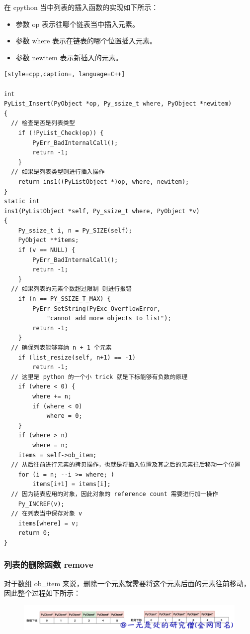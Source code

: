 在 cpython 当中列表的插入函数的实现如下所示：
\begin{itemize}
\item 参数 op 表示往哪个链表当中插入元素。 
\item 参数 where 表示在链表的哪个位置插入元素。 
\item 参数 newitem 表示新插入的元素。 
\end{itemize}
\begin{lstlisting}[style=cpp,caption=, language=C++]

int
PyList_Insert(PyObject *op, Py_ssize_t where, PyObject *newitem)
{
  // 检查是否是列表类型
    if (!PyList_Check(op)) {
        PyErr_BadInternalCall();
        return -1;
    }
  // 如果是列表类型则进行插入操作
    return ins1((PyListObject *)op, where, newitem);
}
static int
ins1(PyListObject *self, Py_ssize_t where, PyObject *v)
{
    Py_ssize_t i, n = Py_SIZE(self);
    PyObject **items;
    if (v == NULL) {
        PyErr_BadInternalCall();
        return -1;
    }
  // 如果列表的元素个数超过限制 则进行报错
    if (n == PY_SSIZE_T_MAX) {
        PyErr_SetString(PyExc_OverflowError,
            "cannot add more objects to list");
        return -1;
    }
  // 确保列表能够容纳 n + 1 个元素
    if (list_resize(self, n+1) == -1)
        return -1;
  // 这里是 python 的一个小 trick 就是下标能够有负数的原理
    if (where < 0) {
        where += n;
        if (where < 0)
            where = 0;
    }
    if (where > n)
        where = n;
    items = self->ob_item;
  // 从后往前进行元素的拷贝操作，也就是将插入位置及其之后的元素往后移动一个位置
    for (i = n; --i >= where; )
        items[i+1] = items[i];
  // 因为链表应用的对象，因此对象的 reference count 需要进行加一操作
    Py_INCREF(v);
  // 在列表当中保存对象 v 
    items[where] = v;
    return 0;
}
\end{lstlisting}
\subsubsection{列表的删除函数 remove}
对于数组 ob\_item 来说，删除一个元素就需要将这个元素后面的元素往前移动，因此整个过程如下所示：

    \begin{figure}[H]
        \centering
            \includegraphics[scale=.3]{images/05-list.png}
            \caption{ }
        \label{fig:my_label}
    \end{figure}
    

